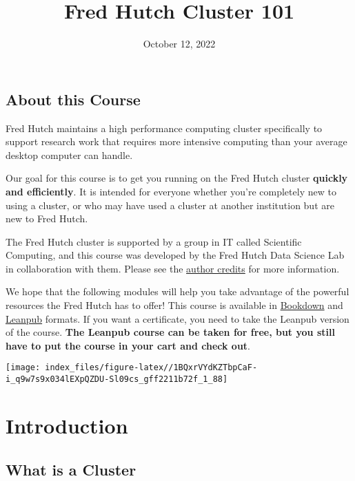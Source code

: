 \documentclass[
]{book}
\title{Fred Hutch Cluster 101}
\author{}
\date{\vspace{-2.5em}October 12, 2022}
\begin{document}
\maketitle

{
\setcounter{tocdepth}{1}
\tableofcontents
}
\hypertarget{about-this-course}{%
\chapter*{About this Course}\label{about-this-course}}

Fred Hutch maintains a high performance computing cluster specifically to support research work that requires more intensive computing than your average desktop computer can handle.

Our goal for this course is to get you running on the Fred Hutch cluster \textbf{quickly and efficiently}. It is intended for everyone whether you're completely new to using a cluster, or who may have used a cluster at another institution but are new to Fred Hutch.

The Fred Hutch cluster is supported by a group in IT called Scientific Computing, and this course was developed by the Fred Hutch Data Science Lab in collaboration with them. Please see the \protect\hyperlink{about-the-authors}{author credits} for more information.

We hope that the following modules will help you take advantage of the powerful resources the Fred Hutch has to offer! This course is available in \href{https://hutchdatascience.org/FH_Cluster_Guide}{Bookdown} and \href{https://leanpub.com/courses/fredhutch/fredhutchcluster101}{Leanpub} formats. If you want a certificate, you need to take the Leanpub version of the course. \textbf{The Leanpub course can be taken for free, but you still have to put the course in your cart and check out}.

\texttt{[image: index\_files/figure-latex//1BQxrVYdKZTbpCaF-i\_q9w7s9x034lEXpQZDU-Sl09cs\_gff2211b72f\_1\_88]}

\hypertarget{part-introduction}{%
\part*{Introduction}\label{part-introduction}}

\hypertarget{what-is-a-cluster}{%
\chapter{What is a Cluster}\label{what-is-a-cluster}}
\end{document}

